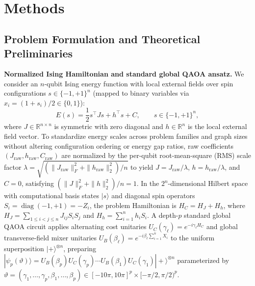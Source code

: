 \documentclass[10pt,a4paper]{article}
\begin{document}
\section*{Methods}

\subsection*{Problem Formulation and Theoretical Preliminaries}

\textbf{Normalized Ising Hamiltonian and standard global QAOA ansatz.} We consider an $n$-qubit Ising energy function with local external fields over spin configurations $s \in \{-1, +1\}^n$ (mapped to binary variables via $x_i = (1 + s_i)/2 \in \{0, 1\}$):
\[
E(s) = \frac{1}{2}s^\top J s + h^\top s + C, \qquad s \in \{-1, +1\}^n,
\]
where $J \in \mathbb{R}^{n \times n}$ is symmetric with zero diagonal and $h \in \mathbb{R}^n$ is the local external field vector. To standardize energy scales across problem families and graph sizes without altering configuration ordering or energy gap ratios, raw coefficients $(J_{\mathrm{raw}}, h_{\mathrm{raw}}, C_{\mathrm{raw}})$ are normalized by the per-qubit root-mean-square (RMS) scale factor $\lambda = \sqrt{(\|J_{\mathrm{raw}}\|_F^2 + \|h_{\mathrm{raw}}\|_2^2)/n}$ to yield $J = J_{\mathrm{raw}}/\lambda$, $h = h_{\mathrm{raw}}/\lambda$, and $C = 0$, satisfying $(\|J\|_F^2 + \|h\|_2^2)/n = 1$. In the $2^n$-dimensional Hilbert space with computational basis states $|s\rangle$ and diagonal spin operators $S_i = \operatorname{diag}(-1, +1) = -Z_i$, the problem Hamiltonian is $H_C = H_J + H_h$, where $H_J = \sum_{1 \le i < j \le n} J_{ij} S_i S_j$ and $H_h = \sum_{i=1}^n h_i S_i$. A depth-$p$ standard global QAOA circuit applies alternating cost unitaries $U_C(\gamma_\ell) = e^{-i\gamma_\ell H_C}$ and global transverse-field mixer unitaries $U_B(\beta_\ell) = e^{-i\beta_\ell \sum_{i=1}^n X_i}$ to the uniform superposition $|+\rangle^{\otimes n}$, preparing $|\psi_p(\vartheta)\rangle = U_B(\beta_p)U_C(\gamma_p)\cdots U_B(\beta_1)U_C(\gamma_1)|+\rangle^{\otimes n}$ parameterized by $\vartheta = (\gamma_1, \ldots, \gamma_p, \beta_1, \ldots, \beta_p) \in [-10\pi, 10\pi]^p \times [-\pi/2, \pi/2)^p$.
\end{document}
